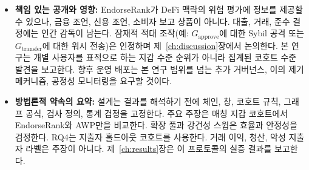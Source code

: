 \begin{itemize}
\item{}\label{sub:responsible-disclosure}
  \textbf{책임 있는 공개와 영향:} EndorseRank가 DeFi 맥락의 위험 평가에 정보를 제공할 수 있으나, 금융 조언, 신용 조언, 소비자 보고 상품이 아니다. 대출, 거래, 준수 결정에는 인간 감독이 남는다. 잠재적 적대 조작(예: $G_{\mathrm{approve}}$에 대한 Sybil 공격 또는 $G_{\mathrm{transfer}}$에 대한 워시 전송)은 인정하며 제~\ref{ch:discussion}장에서 논의한다. 본 연구는 개별 사용자를 표적으로 하는 지갑 수준 순위가 아니라 집계된 코호트 수준 발견을 보고한다. 향후 운영 배포는 본 연구 범위를 넘는 추가 거버넌스, 이의 제기 메커니즘, 공정성 모니터링을 요구할 것이다.


\item{}\label{sub:methodological-commitments}
  \textbf{방법론적 약속의 요약:} 설계는 결과를 해석하기 전에 체인, 창, 코호트 규칙, 그래프 공식, 검사 정의, 통계 검정을 고정한다. 주요 주장은 매칭 지갑 코호트에서 EndorseRank와 AWP만을 비교한다. 확장 풀과 강건성 스윕은 효율과 안정성을 검정한다. RQ4는 지출자 홀드아웃 코호트를 사용한다. 거래 이익, 청산, 악성 지출자 라벨은 주장이 아니다. 제~\ref{ch:results}장은 이 프로토콜의 실증 결과를 보고한다.
\end{itemize}
